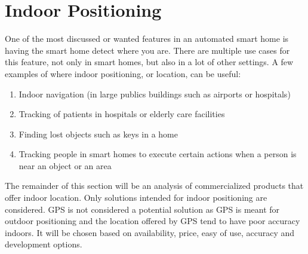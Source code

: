 \section{Indoor Positioning}\label{sec:indoor-positioning}
One of the most discussed or wanted features in an automated smart home is having the smart home detect where you are.
There are multiple use cases for this feature, not only in smart homes, but also in a lot of other settings. 
A few examples of where indoor positioning, or location, can be useful:
\begin{enumerate}
    \item Indoor navigation (\eg in large publics buildings such as airports or hospitals)
    \item Tracking of patients in \eg hospitals or elderly care facilities
    \item Finding lost objects such as keys in a home
    \item Tracking people in smart homes to execute certain actions when a person is near an object or an area
\end{enumerate}

The remainder of this section will be an analysis of commercialized products that offer indoor location.
Only solutions intended for indoor positioning are considered.
GPS is not considered a potential solution as GPS is meant for outdoor positioning and the location offered by GPS tend to have poor accuracy indoors.
It will be chosen based on availability, price, easy of use, accuracy and development options.
 
